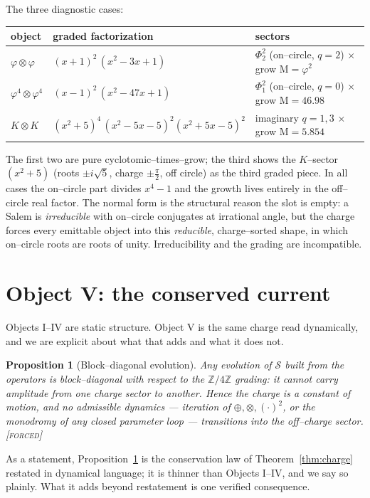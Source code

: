 \documentclass[11pt]{article}
\theoremstyle{plain}
\newtheorem{proposition}[theorem]{Proposition}
\theoremstyle{definition}
\theoremstyle{remark}
\newcommand{\forced}{\textcolor{forcedc}{\textsc{[forced]}}}
\newcommand{\Z}{\mathbb{Z}}
\newcommand{\Mah}{\mathrm{M}}
\newcommand{\Scal}{\mathcal{S}}
\begin{document}
The three diagnostic cases:
\begin{center}
\renewcommand{\arraystretch}{1.25}
\begin{tabular}{@{}lll@{}}
\toprule
object & graded factorization & sectors \\
\midrule
$\varphi\otimes\varphi$ & $(x+1)^2\,(x^2-3x+1)$ & $\Phi_2^2$ (on--circle, $q{=}2$) $\times$ grow $\Mah{=}\varphi^2$\\
$\varphi^4\otimes\varphi^4$ & $(x-1)^2\,(x^2-47x+1)$ & $\Phi_1^2$ (on--circle, $q{=}0$) $\times$ grow $\Mah{=}46.98$\\
$K\otimes K$ & $(x^2+5)^4\,(x^2-5x-5)^2(x^2+5x-5)^2$ & imaginary $q{=}1,3$ $\times$ grow $\Mah{=}5.854$\\
\bottomrule
\end{tabular}
\end{center}
The first two are pure cyclotomic--times--grow; the third shows the $K$--sector $(x^2+5)$ (roots $\pm i\sqrt5$, charge $\pm\tfrac\pi2$, off circle) as the third graded piece. In all cases the on--circle part divides $x^4-1$ and the growth lives entirely in the off--circle real factor. The normal form is the structural reason the slot is empty: a Salem is \emph{irreducible} with on--circle conjugates at irrational angle, but the charge forces every emittable object into this \emph{reducible}, charge--sorted shape, in which on--circle roots are roots of unity. Irreducibility and the grading are incompatible.

\section{Object V: the conserved current}\label{sec:currentV}

Objects I--IV are static structure. Object V is the same charge read dynamically, and we are explicit about what that adds and what it does not.

\begin{proposition}[Block--diagonal evolution]\label{prop:current}
Any evolution of $\Scal$ built from the operators is block--diagonal with respect to the $\Z/4\Z$ grading: it cannot carry amplitude from one charge sector to another. Hence the charge is a constant of motion, and no admissible dynamics --- iteration of $\oplus,\otimes,(\cdot)^2$, or the monodromy of any closed parameter loop --- transitions into the off--charge sector. \forced
\end{proposition}

As a statement, Proposition~\ref{prop:current} is the conservation law of Theorem~\ref{thm:charge} restated in dynamical language; it is thinner than Objects I--IV, and we say so plainly. What it adds beyond restatement is one verified consequence.
\end{document}
